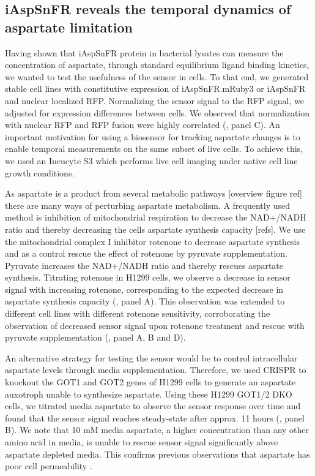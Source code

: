 \documentclass[9pt,lineno]{elife}
\begin{document}
\subsection{iAspSnFR reveals the temporal dynamics of aspartate limitation}
Having shown that iAspSnFR protein in bacterial lysates can measure the concentration of aspartate, through standard equilibrium ligand binding kinetics, we wanted to test the usefulness of the sensor in cells.
To that end, we generated stable cell lines with constitutive expression of iAspSnFR.mRuby3 or iAspSnFR and nuclear localized RFP.
Normalizing the sensor signal to the RFP signal, we adjusted for expression differences between cells.
We observed that normalization with nuclear RFP and RFP fusion were highly correlated (, panel C).
An important motivation for using a biosensor for tracking aspartate changes is to enable temporal measurements on the same subset of live cells.
To achieve this, we used an Incucyte S3 which performs live cell imaging under native cell line growth conditions.

As aspartate is a product from several metabolic pathways [overview figure ref] there are many ways of perturbing aspartate metabolism.
A frequently used method is inhibition of mitochondrial respiration to decrease the NAD+/NADH ratio and thereby decreasing the cells aspartate synthesis capacity [refs].
We use the mitochondrial complex I inhibitor rotenone to decrease aspartate synthesis and as a control rescue the effect of rotenone by pyruvate supplementation.
Pyruvate increases the NAD+/NADH ratio and thereby rescues aspartate synthesis.
Titrating rotenone in H1299 cells, we observe a decrease in sensor signal with increasing rotenone, corresponding to the expected decrease in aspartate synthesis capacity (, panel A).
This observation was extended to different cell lines with different rotenone sensitivity, corroborating the observation of decreased sensor signal upon rotenone treatment and rescue with pyruvate supplementation (, panel A, B and D).

An alternative strategy for testing the sensor would be to control intracellular aspartate levels through media supplementation.
Therefore, we used CRISPR to knockout the GOT1 and GOT2 genes of H1299 cells to generate an aspartate auxotroph unable to synthesize aspartate.
Using these H1299 GOT1/2 DKO cells, we titrated media aspartate to observe the sensor response over time and found that the sensor signal reaches steady-state after approx. 11 hours (, panel B).
We note that 10 mM media aspartate, a higher concentration than any other amino acid in media, is unable to rescue sensor signal significantly above aspartate depleted media.
This confirms previous observations that aspartate has poor cell permeability \citep{Sullivan2018-gz}.
\end{document}
